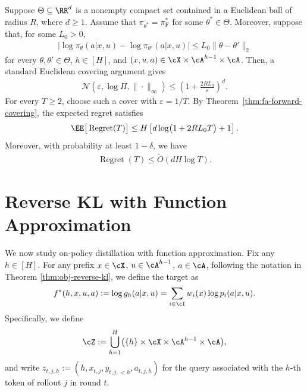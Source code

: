 \documentclass[11pt]{article}
\newcommand{\pif}{\pi_{\mathrm{F}}}
\begin{document}
\begin{example}
\label{cor:fa-forward-parametric}
Suppose $\Theta\subseteq\RR^d$ is a nonempty compact set contained
in a Euclidean ball of radius $R$, where $d\geq1$.
Assume that $\pi_{\theta^*}=\pif^*$ for some $\theta^*\in\Theta$.
Moreover, suppose that, for some $L_0>0$,
\begin{align*}
    \big|
        \log\pi_\theta(a|x,u)
        -
        \log\pi_{\theta'}(a|x,u)
    \big|
    \leq
    L_0\|\theta-\theta'\|_2
\end{align*}
for every $\theta,\theta'\in\Theta$, $h\in[H]$, and
$(x,u,a)\in\cX\times\cA^{h-1}\times\cA$.
Then, a standard Euclidean covering argument gives
\begin{align*}
    \mathcal N(\varepsilon,\log\Pi,\|\cdot\|_\infty)
    \leq
    \left(1+\frac{2RL_0}{\varepsilon}\right)^d.
\end{align*}
For every $T\geq2$, choose such a cover with
$\varepsilon=1/T$.
By Theorem~\ref{thm:fa-forward-covering}, the expected regret satisfies
\begin{align*}
    \EE\big[\operatorname{Regret}(T)\big]
    \leq
    H\left[d\log\bigl(1+2RL_0T\bigr)+1\right].
\end{align*}
Moreover, with probability at least $1-\delta$, we have
\begin{align*}
    \operatorname{Regret}(T) \le \tilde O(dH \log T).
\end{align*}
\end{example}

\section{Reverse KL with Function Approximation}
\label{sec:fa-reverse}
We now study on-policy distillation with function approximation. Fix any $h\in [H]$. For any prefix $x\in \cX$, $u \in \cA^{h-1}$, $a \in \cA$, following the notation in Theorem \ref{thm:obj-reverse-kl}, we define the target as 
\begin{align}
    f^*(h,x,u,a)
    :=
    \log g_h(a|x,u)
    =
    \sum_{i\in\cI}w_i(x)\log p_i(a|x,u).
    \notag
\end{align}
Specifically, we define
\begin{align*}
    \cZ
    :=
    \bigcup_{h=1}^{H}
    \bigl(
        \{h\}\times\cX\times\cA^{h-1}\times\cA
    \bigr),
\end{align*}
and write $z_{t,j,h}:=(h,x_{t,j},y_{t,j,<h},a_{t,j,h})$ for the query associated with the $h$-th token of rollout $j$
in round $t$.
\end{document}
